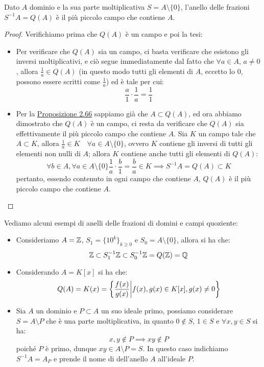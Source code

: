\documentclass[11pt]{scrartcl}
\begin{document}
\begin{proposition}
    [$A \subset Q(A)$]
    \label{2.69}
    Dato $A$ dominio e la sua parte moltiplicativa $S = A\setminus\{0\}$, l'anello delle frazioni $S^{-1}A = Q(A)$ è il più 
    piccolo campo che contiene $A$.
\end{proposition}

\begin{proof}
    Verifichiamo prima che $Q(A)$ è un campo e poi la tesi:
    \begin{itemize}
        \item Per verificare che $Q(A)$ sia un campo, ci basta verificare che esistono gli inversi moltiplicativi, e ciò segue immediatamente
         dal fatto che $\forall a \in A$, $a \ne 0$, allora $\displaystyle\frac{1}{a} \in Q(A)$ (in questo modo tutti gli elementi di $A$, eccetto lo 0,
         possono essere scritti come $\displaystyle\frac{1}{a}$) ed è tale per cui:
            \[ \frac{a}{1} \cdot \frac{1}{a} = \frac{1}{1}
                \]
        \item Per la \hyperref[2.66]{Proposizione 2.66} sappiamo già che $A \subset Q(A)$, ed ora abbiamo dimostrato che $Q(A)$ è un campo, ci resta da verificare che $Q(A)$ sia effettivamente il più piccolo campo che contiene $A$. 
	Sia $K$ un campo tale che $A \subset K$, allora $\displaystyle \frac{1}{a} \in K \quad \forall a \in A \setminus\{0\}$, ovvero $K$ contiene gli inversi di tutti gli elementi non nulli di $A$; 
	allora $K$ contiene anche tutti gli elementi di $Q(A)$:
            \[ \forall b \in A, \forall a \in A \setminus \{0\} \frac{1}{a} \cdot \frac{b}{1} = \frac{b}{a} \in K \implies S^{-1}A = Q(A) \subset K
                \]
        pertanto, essendo contenuto in ogni campo che contiene $A$, $Q(A)$ è il più piccolo campo che contiene $A$.
    \end{itemize}
\end{proof}

\begin{example}
    Vediamo alcuni esempi di anelli delle frazioni di domini e campi quoziente:
    \begin{itemize}
        \item Consideriamo $A = \mathbb Z$, $S_1 = \{10^k\}_{k\geq 0}$ e $S_0 = A \setminus\{0\}$, allora si ha che:
            \[ \mathbb Z \subset S_1^{-1}\mathbb Z \subset S_0^{-1}\mathbb Z = Q(\mathbb Z) = \mathbb Q
                \]
        \item Considerando $A = K[x]$ si ha che:
            \[ Q(A) = K(x) = \left\{\frac{f(x)}{g(x)} \middle| f(x),g(x) \in K[x], g(x) \ne 0\right\}
                \]
        \item Sia $A$ un dominio e $P \subset A$ un suo ideale primo, possiamo considerare $S = A \setminus P$ che è una parte moltiplicativa, in quanto 
            $0 \not\in S$, $1 \in S$ e $\forall x,y \in S$ si ha:
            \[ x,y \not\in P \implies xy \not\in P
                \]
            poiché $P$ è primo, dunque $xy \in A \setminus P = S$. In questo caso indichiamo $S^{-1}A = A_P$ e prende il nome di  dell'anello $A$ all'ideale $P$.
    \end{itemize}
\end{example}
\end{document}
